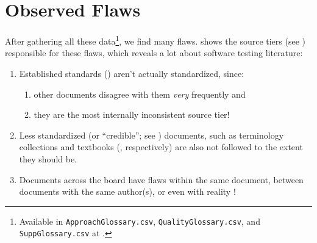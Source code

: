\section{Observed Flaws}\label{flaws}


After gathering all these data\footnote{Available in \texttt{ApproachGlossary.csv},
    \texttt{QualityGlossary.csv}, and \texttt{SuppGlossary.csv} at .}, we find many
flaws.  shows the source tiers (see )
responsible for these flaws, which reveals a lot about software testing literature:
\begin{enumerate}
    \item Established standards () aren't actually standardized, since:
          \begin{enumerate}
              \item other documents disagree with them \emph{very} frequently and
              \item they are the most internally inconsistent source tier!
          \end{enumerate}
    \item Less standardized (or ``credible''; see ) documents,
          such as terminology collections and textbooks (,
          respectively) are also not followed to the extent they should be.
    \item Documents across the board have flaws within the same document,
          between documents with the same author(s), or even with reality%
          !
\end{enumerate}

